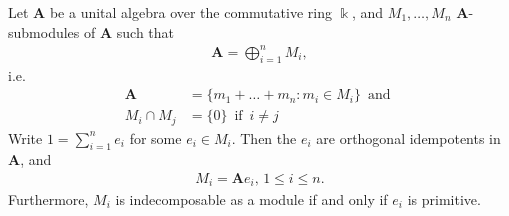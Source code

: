 \begin{proposition}\label{prop:idempotent}
Let $\mathbf{A}$ be a unital algebra over the commutative ring $\Bbbk$, and 
$M_{1},\dots,M_{n}$ $\mathbf{A}$-submodules of $\mathbf{A}$ such that
\begin{align}
\mathbf{A} = \bigoplus_{i=1}^{n} M_{i},
\end{align}
i.e.
\begin{align*}
\mathbf{A} &= \{ m_{1} + \dots + m_{n} : m_{i} \in M_{i} \}\, \text{ and }\\
M_{i} \cap M_{j} &= \{0\}\, \text{ if }\, i\neq j 
\end{align*}
Write $1 = \sum_{i=1}^{n} e_{i}$ for some $e_{i} \in M_{i}$. Then the $e_{i}$ are orthogonal idempotents in $\mathbf{A}$, and
\begin{align*}
M_{i} = \mathbf{A} e_{i},\, 1\leq i \leq n.
\end{align*}
Furthermore, $M_{i}$ is indecomposable as a module if and only if $e_{i}$ is primitive.
\end{proposition}
